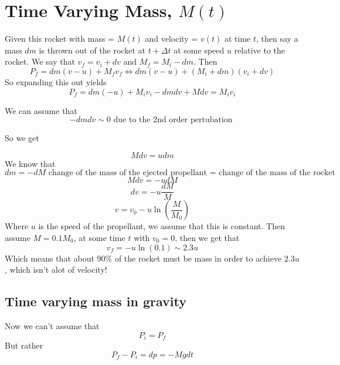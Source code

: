 \documentclass{article}
\newtheorem{one minute paper}[theorem]{One Minute Paper}
\begin{document}
\newpage

\section*{Time Varying Mass, $M(t)$}

Given this rocket with mass = $M(t)$ and velocity = $v(t)$ at time $t$, then say a mass $dm$ is thrown out of the rocket at $t + \Delta t$ at some speed $u$ relative to the rocket. We say that 
$v_f = v_i + dv$ and $M_f = M_i - dm$. Then
\begin{equation}
    P_f = dm(v-u) + M_f v_f \iff dm(v-u) + (M_i + dm)(v_i + dv)
\end{equation}
So expanding this out yields
\begin{equation}
    P_f = dm(-u) + M_iv_i -dmdv + Mdv = M_iv_i
\end{equation}

We can assume that 
\begin{equation}
    -dmdv \sim 0 \text{ due to the 2nd order pertubation }
\end{equation}

So we get 

\begin{equation}
    Mdv = udm
\end{equation}
We know that 
\begin{equation}
    dm = -dM \text{ change of the mass of the ejected propellant = change of the mass of the rocket}
\end{equation}
\begin{equation}
    Mdv = -udM
\end{equation}
\begin{equation}
    dv = -u \frac{dM}{M}
\end{equation}
\begin{equation}
    v = v_0 - u\ln(\frac{M}{M_0})
\end{equation}
Where $u$ is the speed of the propellant, we assume that this is constant. Then assume $M = 0.1M_0$, at some time $t$ with $v_0 = 0$, then we get that 
\begin{equation}
    v_f = -u\ln(0.1) \sim 2.3u
\end{equation}
Which means that about $90\%$ of the rocket must be mass in order to achieve $2.3u$, which isn't alot of velocity!

\subsection*{Time varying mass in gravity}
Now we can't assume that 
\begin{equation}
    P_i = P_f
\end{equation}
But rather
\begin{equation}
    P_f - P_i = dp = -Mgdt
\end{equation}
\end{document}
